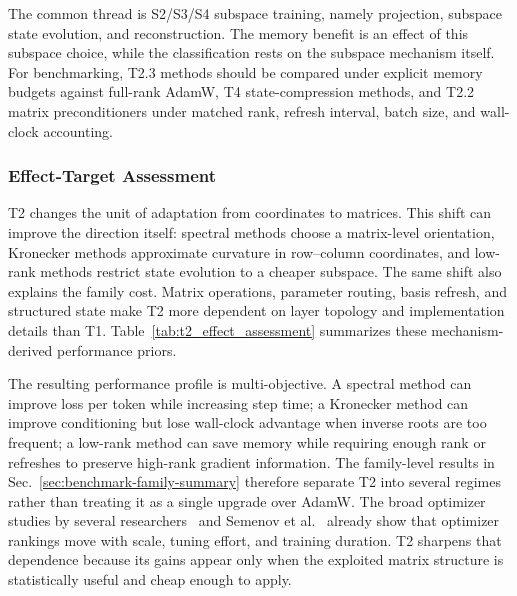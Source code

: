 The common thread is S2/S3/S4 subspace training, namely projection, subspace
state evolution, and reconstruction.  The memory benefit is an effect of this
subspace choice, while the classification rests on the subspace mechanism
itself.  For benchmarking, T2.3
methods should be compared under explicit memory budgets against full-rank
AdamW, T4 state-compression methods, and T2.2 matrix preconditioners under
matched rank, refresh interval, batch size, and wall-clock accounting.

\subsubsection{Effect-Target Assessment}
\label{sec:t2-effect-assessment}

T2 changes the unit of adaptation from coordinates to matrices.  This shift
can improve the direction itself: spectral methods choose a matrix-level
orientation, Kronecker methods approximate curvature in row--column
coordinates, and low-rank methods restrict state evolution to a cheaper
subspace.  The same shift also explains the family cost.  Matrix operations,
parameter routing, basis refresh, and structured state make T2 more dependent
on layer topology and implementation details than T1.  Table~\ref{tab:t2_effect_assessment}
summarizes these mechanism-derived performance priors.



The resulting performance profile is multi-objective.  A spectral method can
improve loss per token while increasing step time; a Kronecker method can
improve conditioning but lose wall-clock advantage when inverse roots are too
frequent; a low-rank method can save memory while requiring enough rank or
refreshes to preserve high-rank gradient information.  The family-level
results in Sec.~\ref{sec:benchmark-family-summary} therefore separate T2 into
several regimes rather than treating it as a single upgrade over AdamW.
The broad optimizer studies by several researchers~\citep{zhao2025deconstructing} and
Semenov et al.~\citep{semenov2025benchmarking} already show that optimizer
rankings move with scale, tuning effort, and training duration. T2 sharpens
that dependence because its gains appear only when the exploited matrix
structure is statistically useful and cheap enough to apply.
